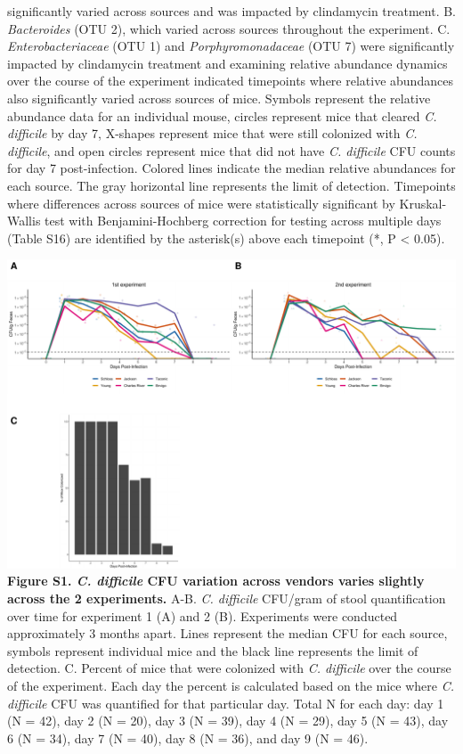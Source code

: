\documentclass[11pt,]{article}
\begin{document}
significantly varied across sources and was impacted by clindamycin
treatment. B. \emph{Bacteroides} (OTU 2), which varied across sources
throughout the experiment. C. \emph{Enterobacteriaceae} (OTU 1) and
\emph{Porphyromonadaceae} (OTU 7) were significantly impacted by
clindamycin treatment and examining relative abundance dynamics over the
course of the experiment indicated timepoints where relative abundances
also significantly varied across sources of mice. Symbols represent the
relative abundance data for an individual mouse, circles represent mice
that cleared \emph{C. difficile} by day 7, X-shapes represent mice that
were still colonized with \emph{C. difficile}, and open circles
represent mice that did not have \emph{C. difficile} CFU counts for day
7 post-infection. Colored lines indicate the median relative abundances
for each source. The gray horizontal line represents the limit of
detection. Timepoints where differences across sources of mice were
statistically significant by Kruskal-Wallis test with Benjamini-Hochberg
correction for testing across multiple days (Table S16) are identified
by the asterisk(s) above each timepoint (*, P \textless{} 0.05).

\newpage

\includegraphics{figure_S1.pdf} \textbf{Figure S1. \emph{C. difficile}
CFU variation across vendors varies slightly across the 2 experiments.}
A-B. \emph{C. difficile} CFU/gram of stool quantification over time for
experiment 1 (A) and 2 (B). Experiments were conducted approximately 3
months apart. Lines represent the median CFU for each source, symbols
represent individual mice and the black line represents the limit of
detection. C. Percent of mice that were colonized with \emph{C.
difficile} over the course of the experiment. Each day the percent is
calculated based on the mice where \emph{C. difficile} CFU was
quantified for that particular day. Total N for each day: day 1 (N =
42), day 2 (N = 20), day 3 (N = 39), day 4 (N = 29), day 5 (N = 43), day
6 (N = 34), day 7 (N = 40), day 8 (N = 36), and day 9 (N = 46).
\end{document}
